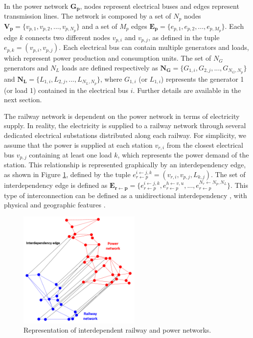 \documentclass[review]{elsarticle}
\begin{document}
	In the power network $\mathbf{G_p}$, nodes represent electrical buses and edges represent transmission lines. The network is composed by a set of $N_p$ nodes $\mathbf{V_p}=\{ v_{p,1}, v_{p,2},...,v_{p,N_p} \}$ and a set of $M_p$ edges $\mathbf{E_p}=\{ e_{p,1}, e_{p,2},...,e_{p,M_p} \}$. Each edge $k$ connects two different nodes $v_{p,i}$ and $v_{p,j}$, as defined in the tuple $e_{p,k} = (v_{p,i}, v_{p,j})$. Each electrical bus can contain multiple generators and loads, which represent power production and consumption units. The set of $N_G$ generators and $N_L$ loads are defined respectively as $\mathbf{N_G}=\{ G_{1,i}, G_{2,j},...,G_{N_G, N_p} \}$ and $\mathbf{N_L}=\{ L_{1,i}, L_{2,j},...,L_{N_L,N_p} \}$, where $G_{1,i}$ (or $L_{1,i}$) represents the generator 1 (or load 1) contained in the electrical bus $i$. Further details are available in the next section.
	
	The railway network is dependent on the power network in terms of electricity supply. In reality, the electricity is supplied to a railway network through several dedicated electrical substations distributed along each railway. For simplicity, we assume that the power is supplied at each station $v_{r,i}$ from the closest electrical bus $v_{p,j}$ containing at least one load $k$, which represents the power demand of the station. This relationship is represented graphically by an interdependency edge, as shown in Figure \ref{NoN}, defined by the tuple $e^{i \leftarrow j,k}_{r\leftarrow p} = (v_{r,i}, v_{p,j}, L_{k,j})$. The set of interdependency edge is defined as $\mathbf{E_{r \leftarrow p}}=\{ e_{r \leftarrow p}^{i \leftarrow j,k}, e_{r \leftarrow p}^{h \leftarrow v,u},...,e_{r \leftarrow p}^{N_r \leftarrow N_p, N_L} \}$. This type of interconnection can be defined as a unidirectional interdependency \cite{johansson2011vulnerability}\cite{mcdaniels2007empirical}, with physical and geographic features \cite{rinaldi2001identifying}.
\begin{figure}[ht]
	\centering
	\includegraphics[width=6cm]{ images/NoN.png}
	\caption{Representation of interdependent railway and power networks.}
	\label{NoN}
\end{figure}	
\end{document}
